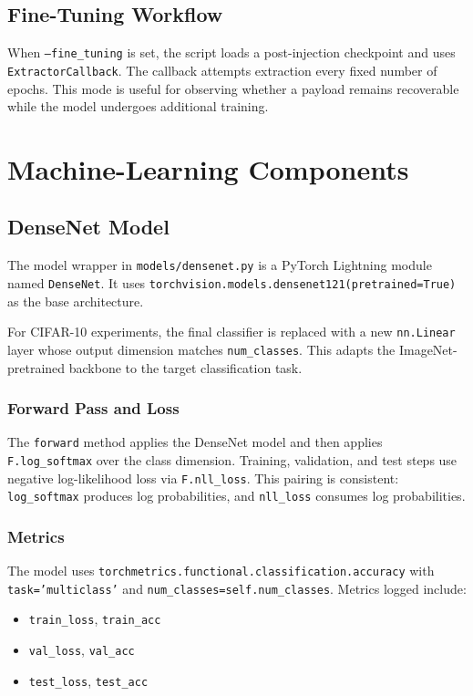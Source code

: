 \documentclass[11pt,a4paper]{article}
\newcommand{\code}[1]{\texttt{#1}}
\begin{document}
\subsection{Fine-Tuning Workflow}

When \code{--fine\_tuning} is set, the script loads a post-injection checkpoint and uses \code{ExtractorCallback}. The callback attempts extraction every fixed number of epochs. This mode is useful for observing whether a payload remains recoverable while the model undergoes additional training.

\section{Machine-Learning Components}

\subsection{DenseNet Model}

The model wrapper in \code{models/densenet.py} is a PyTorch Lightning module named \code{DenseNet}. It uses \code{torchvision.models.densenet121(pretrained=True)} as the base architecture.

For CIFAR-10 experiments, the final classifier is replaced with a new \code{nn.Linear} layer whose output dimension matches \code{num\_classes}. This adapts the ImageNet-pretrained backbone to the target classification task.

\subsubsection{Forward Pass and Loss}

The \code{forward} method applies the DenseNet model and then applies \code{F.log\_softmax} over the class dimension. Training, validation, and test steps use negative log-likelihood loss via \code{F.nll\_loss}. This pairing is consistent: \code{log\_softmax} produces log probabilities, and \code{nll\_loss} consumes log probabilities.

\subsubsection{Metrics}

The model uses \code{torchmetrics.functional.classification.accuracy} with \code{task='multiclass'} and \code{num\_classes=self.num\_classes}. Metrics logged include:

\begin{itemize}[leftmargin=1.4em]
  \item \code{train\_loss}, \code{train\_acc}
  \item \code{val\_loss}, \code{val\_acc}
  \item \code{test\_loss}, \code{test\_acc}
\end{itemize}
\end{document}
